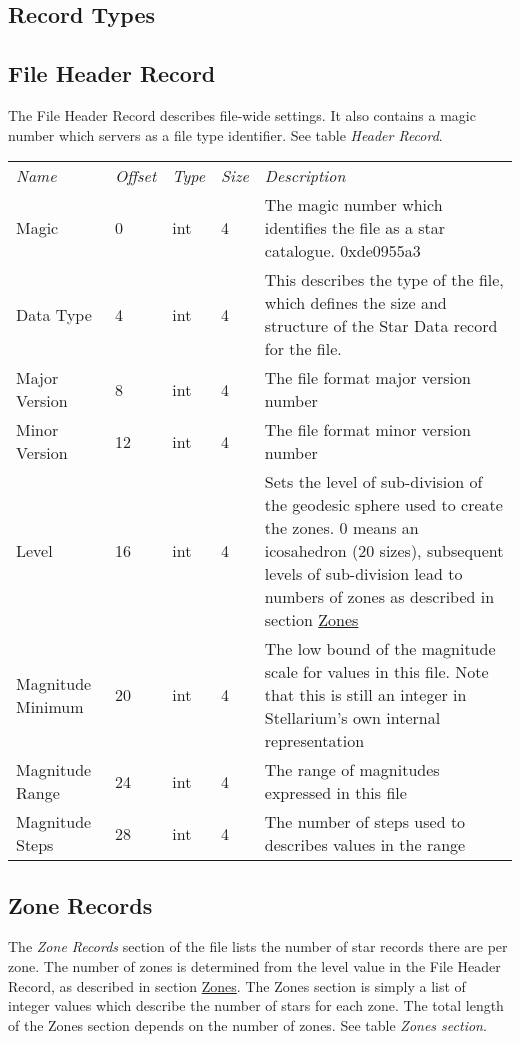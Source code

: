 \subsection{Record Types}\label{record-types}

\subsection{File Header Record}\label{file-header-record}

The File Header Record describes file-wide settings. It also contains a
magic number which servers as a file type identifier. See table
\emph{Header Record}.

\begin{longtable}[c]{@{}lllll@{}}
\toprule
\emph{Name} & \emph{Offset} & \emph{Type} & \emph{Size} &
\emph{Description}\tabularnewline
Magic & 0 & int & 4 & The magic number which identifies the file as a
star catalogue. 0xde0955a3\tabularnewline
Data Type & 4 & int & 4 & This describes the type of the file, which
defines the size and structure of the Star Data record for the
file.\tabularnewline
Major Version & 8 & int & 4 & The file format major version
number\tabularnewline
Minor Version & 12 & int & 4 & The file format minor version
number\tabularnewline
Level & 16 & int & 4 & Sets the level of sub-division of the geodesic
sphere used to create the zones. 0 means an icosahedron (20 sizes),
subsequent levels of sub-division lead to numbers of zones as described
in section \href{Star_Catalogue\#Zones}{Zones}\tabularnewline
Magnitude Minimum & 20 & int & 4 & The low bound of the magnitude scale
for values in this file. Note that this is still an integer in
Stellarium's own internal representation\tabularnewline
Magnitude Range & 24 & int & 4 & The range of magnitudes expressed in
this file\tabularnewline
Magnitude Steps & 28 & int & 4 & The number of steps used to describes
values in the range\tabularnewline
\bottomrule
\end{longtable}

\subsection{Zone Records}\label{zone-records}

The \emph{Zone Records} section of the file lists the number of star
records there are per zone. The number of zones is determined from the
level value in the File Header Record, as described in section
\href{Star_Catalogue\#Zones}{Zones}. The Zones section is simply a list
of integer values which describe the number of stars for each zone. The
total length of the Zones section depends on the number of zones. See
table \emph{Zones section}.

